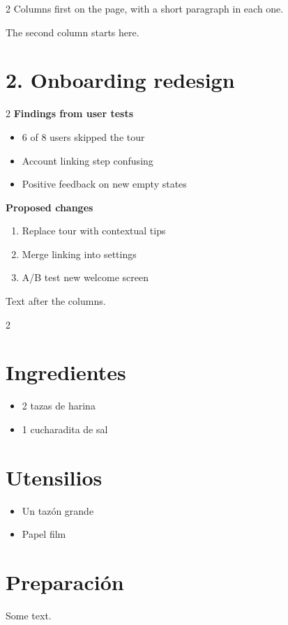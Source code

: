\documentclass{article}
\begin{document}
\begin{multicols}{2}
Columns first on the page, with a short paragraph in each one.
\columnbreak

The second column starts here.
\end{multicols}

\section*{2. Onboarding redesign}
\begin{multicols}{2}
\textbf{Findings from user tests}
\begin{itemize}
  \item 6 of 8 users skipped the tour
  \item Account linking step confusing
  \item Positive feedback on new empty states
\end{itemize}
\columnbreak
\textbf{Proposed changes}
\begin{enumerate}
  \item Replace tour with contextual tips
  \item Merge linking into settings
  \item A/B test new welcome screen
\end{enumerate}
\end{multicols}
Text after the columns.

\begin{multicols}{2}
\section*{Ingredientes}
\begin{itemize}
  \item 2 tazas de harina
  \item 1 cucharadita de sal
\end{itemize}

\columnbreak

\section*{Utensilios}
\begin{itemize}
  \item Un tazón grande
  \item Papel film
\end{itemize}
\end{multicols}

\section*{Preparación}
Some text.
\end{document}
